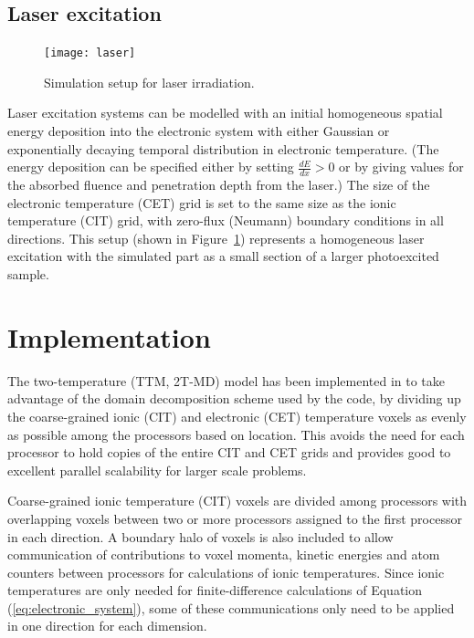 \subsection*{Laser excitation}

\begin{figure}[h] 
	\centering
	{
		\texttt{[image: laser]}
	}
	\caption{Simulation setup for laser irradiation.}
	\label{fig:laser}
\end{figure}
Laser excitation systems can be modelled with an initial homogeneous
spatial energy deposition into the electronic system with either Gaussian 
or exponentially decaying temporal distribution in electronic temperature. 
(The energy deposition can be specified either by setting $\frac{dE}{dx} > 0$ 
or by giving values for the absorbed fluence and penetration depth from the 
laser.) The size of the electronic temperature (CET) grid is set to the same 
size as the ionic temperature (CIT) grid, with zero-flux (Neumann) boundary 
conditions in all directions. This setup (shown in Figure~\ref{fig:laser}) 
represents a homogeneous laser excitation with the simulated part as a 
small section of a larger photoexcited sample.

\section{Implementation}

The two-temperature (TTM, 2T-MD) model has been implemented in \D
to take advantage of the domain decomposition scheme used by the code,
by dividing up the coarse-grained ionic (CIT) and electronic (CET) 
temperature voxels as evenly as possible among the processors based on 
location. This avoids the need for each processor to hold copies of the 
entire CIT and CET grids and provides good to excellent parallel scalability 
for larger scale problems.

Coarse-grained ionic temperature (CIT) voxels are divided among processors 
with overlapping voxels between two or more processors assigned to the 
first processor in each direction. A boundary halo of voxels is also included 
to allow communication of contributions to voxel momenta, kinetic energies and 
atom counters between processors for calculations of ionic temperatures. Since 
ionic temperatures are only needed for finite-difference calculations of 
Equation (\ref{eq:electronic_system}), some of these communications only 
need to be applied in one direction for each dimension. 

